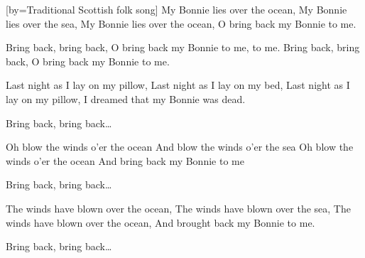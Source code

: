[by={Traditional Scottish folk song}]
\beginverse
My Bonnie lies over the ocean,
My Bonnie lies over the sea,
My Bonnie lies over the ocean,
O bring back my Bonnie to me.
\endverse

\beginchorus
Bring back, bring back, 
O bring back my Bonnie to me, to me.
Bring back, bring back, 
O bring back my Bonnie to me.
\endchorus

\beginverse
Last night as I lay on my pillow,
Last night as I lay on my bed,
Last night as I lay on my pillow,
I dreamed that my Bonnie was dead.
\endverse

\beginchorus
Bring back, bring back\dots
\endchorus

\beginverse
Oh blow the winds o'er the ocean
And blow the winds o'er the sea
Oh blow the winds o'er the ocean
And bring back my Bonnie to me
\endverse

\beginchorus
Bring back, bring back\dots
\endchorus

\beginverse
The winds have blown over the ocean,
The winds have blown over the sea,
The winds have blown over the ocean,
And brought back my Bonnie to me.
\endverse

\beginchorus
Bring back, bring back\dots
\endchorus
\endsong
